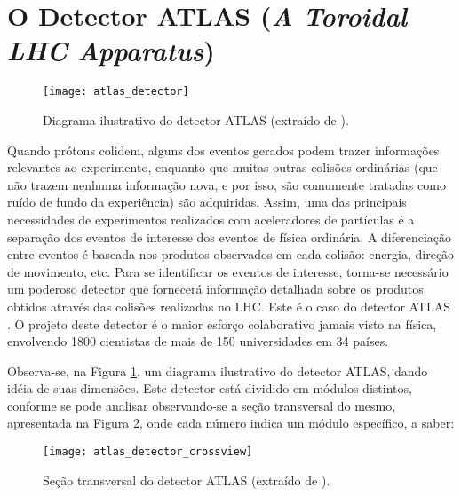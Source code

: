 \section{O Detector ATLAS (\emph{A Toroidal LHC Apparatus})}
\label{SEC:ATLAS}

\begin{figure}
\begin{center}
\texttt{[image: atlas\_detector]}
\caption[Diagrama ilustrativo do detector ATLAS.]{Diagrama ilustrativo do detector ATLAS (extraído de \cite{bib:atlas}).}
\label{FIG:DETECTOR_ATLAS}
\end{center}
\end{figure}

Quando prótons colidem, alguns dos eventos gerados podem trazer informações relevantes ao experimento, enquanto que muitas outras colisões ordinárias (que não trazem nenhuma informação nova, e por isso, são comumente tratadas como ruído de fundo da experiência) são adquiridas. Assim, uma das principais necessidades de experimentos realizados com aceleradores de partículas é a separação dos eventos de interesse dos eventos de física ordinária. A diferenciação entre eventos é baseada nos produtos observados em cada colisão: energia, direção de movimento, etc. Para se identificar os eventos de interesse, torna-se necessário um poderoso detector que fornecerá informação detalhada sobre os produtos obtidos através das colisões realizadas no LHC. Este é o caso do detector ATLAS \cite{bib:site_atlas}. O projeto deste detector é o maior esforço colaborativo jamais visto na física, envolvendo 1800 cientistas de mais de 150 universidades em 34
países.

Observa-se, na Figura \ref{FIG:DETECTOR_ATLAS}, um diagrama ilustrativo do detector ATLAS, dando idéia de suas dimensões. Este detector está dividido em módulos distintos, conforme se pode analisar observando-se a seção transversal do mesmo, apresentada na Figura \ref{FIG:SECAO_TRANSVERSAL_ATLAS}, onde cada número indica um módulo específico, a saber:

\begin{figure}
\begin{center}
\texttt{[image: atlas\_detector\_crossview]}
\caption[Seção transversal do detector ATLAS.]{Seção transversal do detector ATLAS (extraído de \cite{bib:site_atlas}).}
\label{FIG:SECAO_TRANSVERSAL_ATLAS}
\end{center}
\end{figure}

